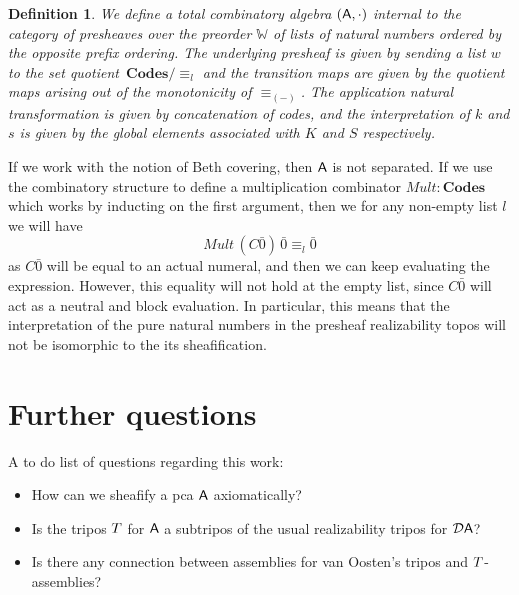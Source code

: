 \documentclass[11pt]{article}
\newtheorem{defn}[thrm]{Definition}
\begin{document}
\begin{defn}
  We define a total combinatory algebra \((\mathsf{A},{\cdot})\) internal to the category
  of presheaves over the preorder \(\mathbb{W}\) of lists of natural numbers
  ordered by the opposite prefix ordering.
  The underlying presheaf is given by sending a list \(w\)
  to the set quotient~\(\textbf{Codes}/{\equiv_{l}}\) and
  the transition maps are given by the quotient maps arising out of the
  monotonicity of \({\equiv_{(-)}}\).
  The application natural transformation is given by concatenation of codes, and
  the interpretation of \(k\) and \(s\) is given by the global elements
  associated with \(K\) and \(S\) respectively.
\end{defn}

If we work with the notion of Beth covering, then \(\mathsf{A}\) is not separated.
%
If we use the combinatory structure to define a multiplication combinator
\({Mult}:\textbf{Codes}\) which works by inducting on the first argument, then
we for any non-empty list \(l\) we will have
%
\[
  {{Mult}\,(C\bar{0})\,\bar{0}} \equiv_{l} \bar{0}
\]
%
as \(C\bar{0}\) will be equal to an actual numeral, and then we can keep
evaluating the expression.
%
However, this equality will not hold at the empty list, since \(C{\bar{0}}\)
will act as a neutral and block evaluation.
%
In particular, this means that the interpretation of the pure natural numbers
in the presheaf realizability topos will not be isomorphic to the
its sheafification.

\newpage

\section{Further questions}

A to do list of questions regarding this work:
%
\begin{itemize}
  \item How can we sheafify a pca \(\mathsf{A}\) axiomatically?
  \item Is the tripos \(T\) for \(\mathsf{A}\) a subtripos of the usual realizability
    tripos for \(\mathcal{D}{\mathsf{A}}\)?
  \item Is there any connection between assemblies for van Oosten's tripos and
    \(T\)-assemblies?
\end{itemize}

\newpage

\printbibliography{}
\end{document}
